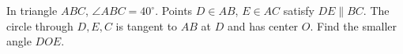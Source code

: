 In triangle $ABC$, $\angle ABC=40^\circ$. Points $D\in AB$, $E\in AC$ satisfy $DE\parallel BC$. The circle through $D,E,C$ is tangent to $AB$ at $D$ and has center $O$. Find the smaller angle $DOE$.
